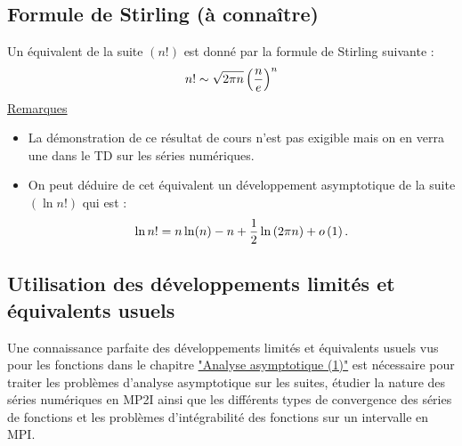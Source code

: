 \subsection{Formule de Stirling (à connaître)}
\begin{defprop}
    Un équivalent de la suite \((n!)\) est donné par la formule de Stirling suivante :
    \[n! \sim \sqrt{2\pi n} \left(\frac{n}{e}\right)^n\]
    \underline{Remarques}\\
    \begin{itemize}
        \item La démonstration de ce résultat de cours n’est pas exigible mais on en verra une dans le TD sur les séries numériques.
        \item On peut déduire de cet équivalent un développement asymptotique de la suite \((\ln n!)\) qui est :
        \[\ln n! = n \ln (n) - n + \frac{1}{2} \ln \left(2 \pi n\right) + o\left(1\right).\]
    \end{itemize}
\end{defprop}

\subsection{Utilisation des développements limités et équivalents usuels}
\begin{defprop}
    Une connaissance parfaite des développements limités et équivalents usuels vus pour les fonctions dans le chapitre \hyperref[chap:analyse-asymptotique1]{"Analyse asymptotique (1)"} est nécessaire pour traiter les problèmes d’analyse asymptotique sur les suites, étudier la nature des séries numériques en MP2I ainsi que les différents types de convergence des séries de fonctions et les problèmes d’intégrabilité des fonctions sur un intervalle en MPI.
\end{defprop}